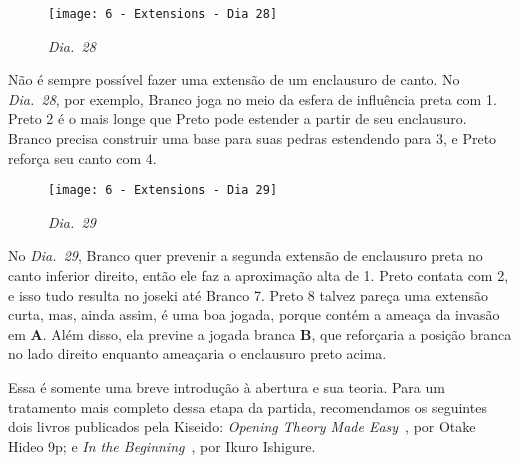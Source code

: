 \pagebreak

\begin{wrapfigure}{r}{60mm}
    \vspace{-15pt}
    \begin{center}
        \texttt{[image: 6 - Extensions - Dia 28]}
        \captionsetup{justification=centering}
        \caption*{\emph{Dia.\@~28}}
    \end{center}
    \vspace{-20pt}
\end{wrapfigure}

Não é sempre possível fazer uma extensão de um enclausuro de canto. No \emph{Dia.\@~28}, por exemplo, Branco joga no meio da esfera de influência preta com 1. Preto 2 é o mais longe que Preto pode estender a partir de seu enclausuro. Branco precisa construir uma base para suas pedras estendendo para 3, e Preto reforça seu canto com 4.

\begin{wrapfigure}{l}{60mm}
    \vspace{-27.5pt}
    \begin{center}
        \texttt{[image: 6 - Extensions - Dia 29]}
        \captionsetup{justification=centering}
        \caption*{\emph{Dia.\@~29}}
    \end{center}
    \vspace{-10pt}
\end{wrapfigure}

No \emph{Dia.\@~29}, Branco quer prevenir a segunda extensão de enclausuro preta no canto inferior direito, então ele faz a aproximação alta de 1. Preto contata com 2, e isso tudo resulta no joseki até Branco 7. Preto 8 talvez pareça uma extensão curta, mas, ainda assim, é uma boa jogada, porque contém a ameaça da invasão em \textbf{A}. Além disso, ela previne a jogada branca \textbf{B}, que reforçaria a posição branca no lado direito enquanto ameaçaria o enclausuro preto acima.

\bigskip

Essa é somente uma breve introdução à abertura e sua teoria. Para um tratamento mais completo dessa etapa da partida, recomendamos os seguintes dois livros publicados pela Kiseido: \emph{Opening Theory Made Easy}~\cite{otake_opening_theory_made_easy}, por Otake Hideo 9p; e \emph{In the Beginning}~\cite{ikure_in_the_beginning}, por Ikuro Ishigure.